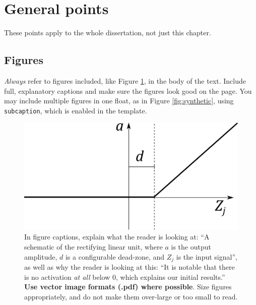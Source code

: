 \documentclass{l4proj}
\begin{document}
\section{General points}

These points apply to the whole dissertation, not just this chapter.



\subsection{Figures}
\emph{Always} refer to figures included, like Figure \ref{fig:relu}, in the body of the text. Include full, explanatory captions and make sure the figures look good on the page.
You may include multiple figures in one float, as in Figure \ref{fig:synthetic}, using \texttt{subcaption}, which is enabled in the template.



\begin{figure}
    \centering
    \includegraphics[width=0.5\linewidth]{images/relu.pdf}    

    \caption{In figure captions, explain what the reader is looking at: ``A schematic of the rectifying linear unit, where $a$ is the output amplitude,
    $d$ is a configurable dead-zone, and $Z_j$ is the input signal'', as well as why the reader is looking at this: 
    ``It is notable that there is no activation \emph{at all} below 0, which explains our initial results.'' 
    \textbf{Use vector image formats (.pdf) where possible}. Size figures appropriately, and do not make them over-large or too small to read.
    }

    \label{fig:relu} 
\end{figure}
\end{document}
